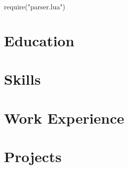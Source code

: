 \documentclass[letterpaper,10pt]{article}
\begin{document}
\begin{luacode}
require("parser.lua")
\end{luacode}


\section{Education}
  \resumeSubHeadingListStart
  
  \resumeSubHeadingListEnd
  
\section{Skills}
  \resumeSubHeadingListStart 
  
  \resumeSubHeadingListEnd

\section{Work Experience}
  \resumeSubHeadingListStart
  	
  \resumeSubHeadingListEnd

\section{{Projects}}
  \resumeSubHeadingListStart
  \resumeSubHeadingListEnd

\end{document}
